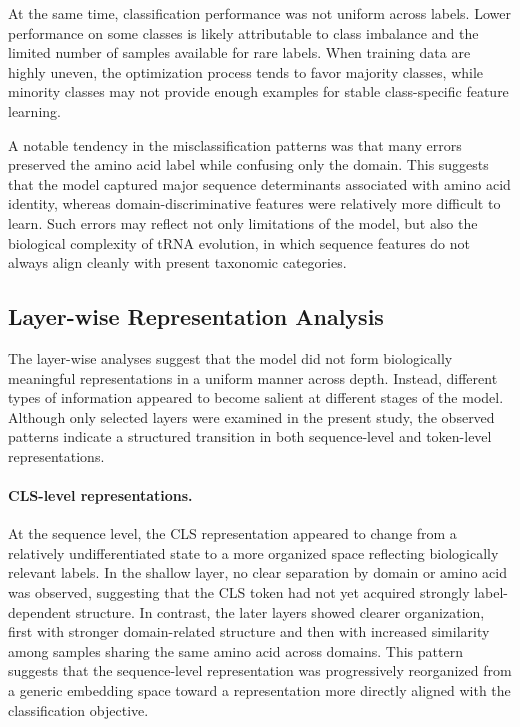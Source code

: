 \documentclass[a4paper,11pt,draft]{jsarticle}
\begin{document}
At the same time, classification performance was not uniform across labels. Lower performance on some classes is likely attributable to class imbalance and the limited number of samples available for rare labels. When training data are highly uneven, the optimization process tends to favor majority classes, while minority classes may not provide enough examples for stable class-specific feature learning.

A notable tendency in the misclassification patterns was that many errors preserved the amino acid label while confusing only the domain. This suggests that the model captured major sequence determinants associated with amino acid identity, whereas domain-discriminative features were relatively more difficult to learn. Such errors may reflect not only limitations of the model, but also the biological complexity of tRNA evolution, in which sequence features do not always align cleanly with present taxonomic categories.

\subsection{Layer-wise Representation Analysis}
\label{subsec:internal_analysis_discussion}

The layer-wise analyses suggest that the model did not form biologically meaningful representations in a uniform manner across depth. Instead, different types of information appeared to become salient at different stages of the model. Although only selected layers were examined in the present study, the observed patterns indicate a structured transition in both sequence-level and token-level representations. 

\paragraph{CLS-level representations.}
At the sequence level, the CLS representation appeared to change from a relatively undifferentiated state to a more organized space reflecting biologically relevant labels. In the shallow layer, no clear separation by domain or amino acid was observed, suggesting that the CLS token had not yet acquired strongly label-dependent structure. In contrast, the later layers showed clearer organization, first with stronger domain-related structure and then with increased similarity among samples sharing the same amino acid across domains. This pattern suggests that the sequence-level representation was progressively reorganized from a generic embedding space toward a representation more directly aligned with the classification objective. 
\end{document}

